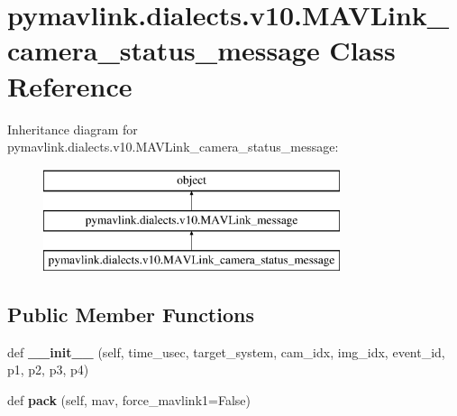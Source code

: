\hypertarget{classpymavlink_1_1dialects_1_1v10_1_1MAVLink__camera__status__message}{}\section{pymavlink.\+dialects.\+v10.\+M\+A\+V\+Link\+\_\+camera\+\_\+status\+\_\+message Class Reference}
\label{classpymavlink_1_1dialects_1_1v10_1_1MAVLink__camera__status__message}
Inheritance diagram for pymavlink.\+dialects.\+v10.\+M\+A\+V\+Link\+\_\+camera\+\_\+status\+\_\+message\+:\begin{figure}[H]
\begin{center}
\leavevmode
\includegraphics[height=3.000000cm]{classpymavlink_1_1dialects_1_1v10_1_1MAVLink__camera__status__message}
\end{center}
\end{figure}
\subsection*{Public Member Functions}
\begin{DoxyCompactItemize}
\item 
\mbox{\label{classpymavlink_1_1dialects_1_1v10_1_1MAVLink__camera__status__message_a9f90051f2164ced82afa04148a842394}} 
def {\bfseries \+\_\+\+\_\+init\+\_\+\+\_\+} (self, time\+\_\+usec, target\+\_\+system, cam\+\_\+idx, img\+\_\+idx, event\+\_\+id, p1, p2, p3, p4)
\item 
\mbox{\label{classpymavlink_1_1dialects_1_1v10_1_1MAVLink__camera__status__message_aef5439da25459f980216741a234274ce}} 
def {\bfseries pack} (self, mav, force\+\_\+mavlink1=False)
\end{DoxyCompactItemize}
